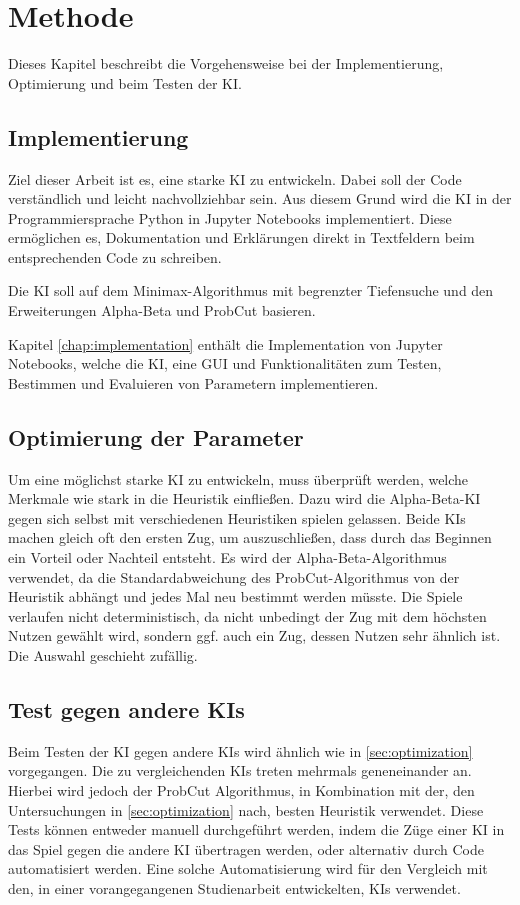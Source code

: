 
\chapter{Methode}
\label{chap:methode}

Dieses Kapitel beschreibt die Vorgehensweise bei der Implementierung, Optimierung und beim Testen der \ac{KI}.

\section{Implementierung}
Ziel dieser Arbeit ist es, eine starke \ac{KI} zu entwickeln. Dabei soll der Code verständlich und leicht nachvollziehbar
sein. Aus diesem Grund wird die \ac{KI} in der Programmiersprache Python in Jupyter Notebooks implementiert. Diese
ermöglichen es, Dokumentation und Erklärungen direkt in Textfeldern beim entsprechenden Code zu schreiben.

Die \ac{KI} soll auf dem Minimax-Algorithmus mit begrenzter Tiefensuche und den Erweiterungen Alpha-Beta und ProbCut
basieren.

Kapitel \ref{chap:implementation} enthält die Implementation von Jupyter Notebooks, welche die \ac{KI}, eine \ac{GUI}
und Funktionalitäten zum Testen, Bestimmen und Evaluieren von Parametern implementieren.

\section{Optimierung der Parameter}
\label{sec:optimization}
Um eine möglichst starke \ac{KI} zu entwickeln, muss überprüft werden, welche Merkmale wie stark in die Heuristik einfließen.
Dazu wird die Alpha-Beta-\ac{KI} gegen sich selbst mit verschiedenen Heuristiken spielen gelassen. Beide \acp{KI} machen gleich
oft den ersten Zug, um auszuschließen, dass durch das Beginnen ein Vorteil oder Nachteil entsteht. Es wird der
Alpha-Beta-Algorithmus verwendet, da die Standardabweichung des ProbCut-Algorithmus von der Heuristik abhängt und jedes
Mal neu bestimmt werden müsste. Die Spiele verlaufen nicht deterministisch, da nicht unbedingt der Zug mit dem höchsten
Nutzen gewählt wird, sondern ggf. auch ein Zug, dessen Nutzen sehr ähnlich ist. Die Auswahl geschieht zufällig.

\section{Test gegen andere \acp{KI}}
Beim Testen der \ac{KI} gegen andere \acp{KI} wird ähnlich wie in \autoref{sec:optimization} vorgegangen. Die zu vergleichenden
\acp{KI} treten mehrmals geneneinander an. Hierbei wird jedoch der ProbCut Algorithmus, in Kombination mit der, den
Untersuchungen in \autoref{sec:optimization} nach, besten Heuristik verwendet. Diese Tests können entweder manuell
durchgeführt werden, indem die Züge einer \ac{KI} in das Spiel gegen die andere \ac{KI} übertragen werden, oder alternativ
durch Code automatisiert werden. Eine solche Automatisierung wird für den Vergleich mit den, in einer vorangegangenen
Studienarbeit entwickelten, \acp{KI} verwendet.

